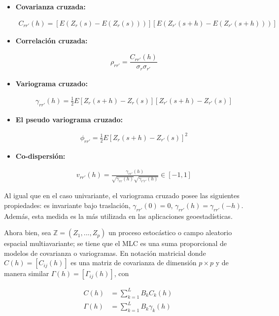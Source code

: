 \documentclass[
]{book}
\begin{document}
\begin{itemize}
\item
  \textbf{Covarianza cruzada:}

  \begin{align*}
        C_{rr'}(h)=\left[E(Z_r(s)-E(Z_r(s))) \right]\left[E(Z_{r'}(s+h)-E(Z_{r'}(s+h))) \right]
    \end{align*}
\item
  \textbf{Correlación cruzada:}

  \begin{align*}
        \rho_{rr'}=\dfrac{C_{rr'}(h)}{\sigma_r \sigma_{r'}}
    \end{align*}
\item
  \textbf{Variograma cruzado:}

  \begin{align*}
        \gamma_{rr'}(h)=\frac{1}{2}E\left[Z_r(s+h)-Z_r(s) \right]\left[ Z_{r'}(s+h)-Z_{r'}(s)\right]
    \end{align*}
\item
  \textbf{El pseudo variograma cruzado:}

  \begin{align*}
        \phi_{rr'}=\frac{1}{2}E\left[Z_r(s+h)-Z_{r'}(s) \right]^2
    \end{align*}
\item
  \textbf{Co-dispersión:}

  \begin{align*}
        v_{rr'}(h)=\frac{\gamma_{rr'}(h)}{\sqrt{\gamma_{rr}(h)}\sqrt{\gamma_{r'r'}(h)} } \in [-1,1]
    \end{align*}
\end{itemize}

Al igual que en el caso univariante, el variograma cruzado posee las siguientes propiedades: es invariante bajo traslación, \(\gamma_{rr'}(0)=0\), \(\gamma_{rr'}(h)=\gamma_{rr'}(-h)\). Además, esta medida es la más utilizada en las aplicaciones geoestadísticas.

Ahora bien, sea \(\mathbb{Z}=(Z_1,...,Z_p)\) un proceso estocástico o campo aleatorio espacial multiavariante; se tiene que el MLC es una suma proporcional de modelos de covarianza o variogramas. En notación matricial donde \(C(h)=[C_{ij}(h)]\) es una matriz de covarianza de dimensión \(p\times p\) y de manera similar \(\Gamma(h)=[\Gamma_{ij}(h)]\), con

\begin{align*}
    C(h)&=\sum_{k=1}^{L}B_kC_k(h)\\
    \Gamma(h)&=\sum_{k=1}^LB_k\gamma_k(h)
\end{align*}
\end{document}
